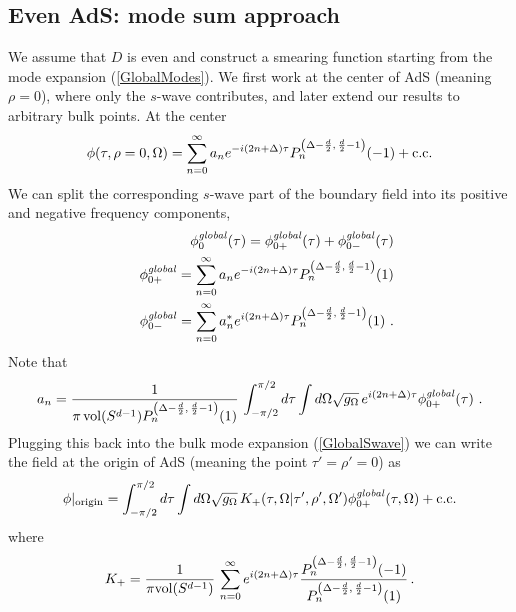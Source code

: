 \documentclass[12pt]{article}
\newcommand{\phinotg} [1]{{\phi_{0#1}^{\it global}}}
\begin{document}
\subsection{Even AdS: mode sum approach} \label{egads}

We assume that $D$ is even and construct a smearing function starting from the mode expansion (\ref{GlobalModes}).
We first work at the center of AdS (meaning $\rho = 0$), where only the $s$-wave contributes, and later extend
our results to arbitrary bulk points.  At the center
\begin{equation}
\label{GlobalSwave}
\phi(\tau,\rho = 0,\Omega) = \sum_{n = 0}^\infty a_n e^{-i(2n+\Delta)\tau} P_n^{\left(\Delta - {d \over 2},\,
{d \over 2} - 1\right)}(-1) + {\rm c.c.}
\end{equation}
We can split the corresponding $s$-wave part of the boundary field into its positive and negative frequency components,
\begin{eqnarray}
&&\phinotg{}(\tau) = \phinotg{+}(\tau) + \phinotg{-}(\tau) \\
\label{GlobalSplus}
&&\phinotg{+} = \sum_{n = 0}^\infty a_n e^{-i(2n+\Delta)\tau} P_n^{\left(\Delta - {d \over 2},\,{d \over 2} - 1\right)}(1) \\
\label{GlobalSminus}
&&\phinotg{-} = \sum_{n = 0}^\infty a_n^* e^{i(2n+\Delta)\tau} P_n^{\left(\Delta - {d \over 2},\,{d \over 2} - 1\right)}(1)~.
\end{eqnarray}
Note that
\begin{equation}
a_n = {1 \over \pi \, {\rm vol}(S^{d-1}) P_n^{\left(\Delta - {d \over 2},\,{d \over 2} - 1\right)}(1)} \,
\int_{-\pi/2}^{\pi/2} d\tau \int d\Omega \sqrt{g_\Omega} \, e^{i(2n+\Delta)\tau} \phinotg{+}(\tau) ~.
\end{equation}
Plugging this back into the bulk mode expansion (\ref{GlobalSwave}) we can write the field at the origin of AdS
(meaning the point $\tau' = \rho' = 0$) as
\begin{equation}
\label{OddOrigin}
\phi \vert_{\rm origin} = \int_{-\pi/2}^{\pi/2} d\tau \int d\Omega \sqrt{g_\Omega} \, K_+(\tau,\Omega \vert \tau',\rho',\Omega')
\phinotg{+}(\tau,\Omega) + {\rm c.c.}
\end{equation}
where
\begin{equation}
K_+ = {1 \over \pi {\rm vol}(S^{d-1})} \, \sum_{n = 0}^\infty e^{i (2n+\Delta) \tau}  {P_n^{\left(\Delta - {d \over 2},\,
{d \over 2} - 1\right)}(-1) \over P_n^{\left(\Delta - {d \over 2},\, {d \over 2} - 1\right)}(1)}\,.
\end{equation}
\end{document}
